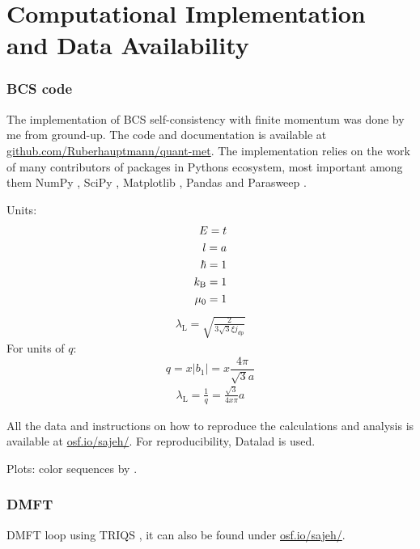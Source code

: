 \documentclass[../notes.tex]{subfiles}
\begin{document}
\raggedbottom
	
\chapter{Computational Implementation and Data Availability}

\subsection*{BCS code}

The implementation of BCS self-consistency with finite momentum was done by me from ground-up.
The code and documentation is available at \href{https://github.com/Ruberhauptmann/quant-met}{github.com/Ruberhauptmann/quant-met}.
The implementation relies on the work of many contributors of packages in Pythons ecosystem, most important among them NumPy \cite{harrisArrayProgrammingNumPy2020}, SciPy \cite{virtanenSciPy10Fundamental2020}, Matplotlib \cite{hunterMatplotlib2DGraphics2007}, Pandas \cite{mckinneyDataStructuresStatistical2010, thepandasdevelopmentteamPandasdevPandasPandas2024} and Parasweep \cite{bachParasweepTemplatebasedUtility2021}.

Units:
\begin{align}
	E = t \\
	l = a \\
	\hbar = 1 \\
	k_{\mathrm{B}} = 1 \\
	\mu_0 = 1
\end{align}
\begin{align}
	\lambda_{\mathrm{L}} = \sqrt{\frac{2}{3 \sqrt{3} \xi j_{dp}}}
\end{align}
For units of \(q\):
\begin{equation}
	q = x \vert b_1 \vert = x \frac{4 \pi}{\sqrt{3} a}
\end{equation}
\begin{align}
	\lambda_{\mathrm{L}} = \frac{1}{q} = \frac{\sqrt{3}}{4 x \pi} a
\end{align}

All the data and instructions on how to reproduce the calculations and analysis is available at \href{https://osf.io/sajeh/}{osf.io/sajeh/}.
For reproducibility, Datalad \cite{halchenkoDataLadDistributedSystem2021} is used.

Plots: color sequences by \citeauthor{petroffAccessibleColorSequences2024} \cite{petroffAccessibleColorSequences2024}.

\subsection*{DMFT}

DMFT loop using TRIQS \cite{parcolletTRIQSToolboxResearch2015}, it can also be found under \href{https://osf.io/sajeh/}{osf.io/sajeh/}.
\end{document}
